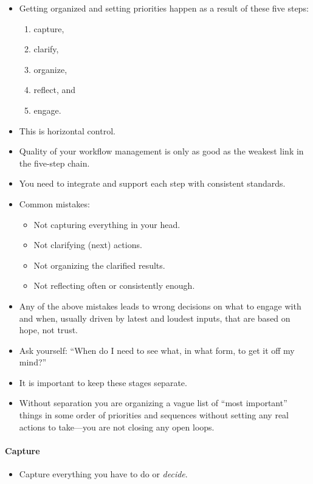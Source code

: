 \documentclass{article}
\begin{document}
\begin{itemize}
  \item Getting organized and setting priorities happen as a result of these five steps:
  \begin{enumerate}
      \item capture,
      \item clarify,
      \item organize,
      \item reflect, and
      \item engage.
  \end{enumerate}
  \item This is horizontal control.
  \item Quality of your workflow management is only as good as the weakest link in the five-step chain.
  \item You need to integrate and support each step with consistent standards.
  \item Common mistakes:
  \begin{itemize}
    \item Not capturing everything in your head.
    \item Not clarifying (next) actions.
    \item Not organizing the clarified results.
    \item Not reflecting often or consistently enough.
  \end{itemize}
  \item Any of the above mistakes leads to wrong decisions on what to engage with and when, usually driven by latest and loudest inputs, that are based on hope, not trust.
  \item Ask yourself: ``When do I need to see what, in what form, to get it off my mind?''
  \item It is important to keep these stages separate.
  \item Without separation you are organizing a vague list of ``most important'' things in some order of priorities and sequences without setting any real actions to take---you are not closing any open loops.
\end{itemize}

\paragraph{Capture}

\begin{itemize}
  \item Capture everything you have to do or \emph{decide}.
\end{itemize}
\end{document}
